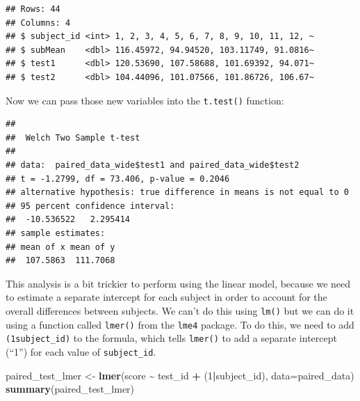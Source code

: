 \documentclass[
  12pt,
]{book}
\newenvironment{Shaded}{\begin{snugshade}}{\end{snugshade}}
\newcommand{\AttributeTok}[1]{\textcolor[rgb]{0.13,0.29,0.53}{#1}}
\newcommand{\DecValTok}[1]{\textcolor[rgb]{0.00,0.00,0.81}{#1}}
\newcommand{\FunctionTok}[1]{\textcolor[rgb]{0.13,0.29,0.53}{\textbf{#1}}}
\newcommand{\NormalTok}[1]{#1}
\newcommand{\OtherTok}[1]{\textcolor[rgb]{0.56,0.35,0.01}{#1}}
\newcommand{\SpecialCharTok}[1]{\textcolor[rgb]{0.81,0.36,0.00}{\textbf{#1}}}
\newcommand{\StringTok}[1]{\textcolor[rgb]{0.31,0.60,0.02}{#1}}
\begin{document}
\begin{verbatim}
## Rows: 44
## Columns: 4
## $ subject_id <int> 1, 2, 3, 4, 5, 6, 7, 8, 9, 10, 11, 12, ~
## $ subMean    <dbl> 116.45972, 94.94520, 103.11749, 91.0816~
## $ test1      <dbl> 120.53690, 107.58688, 101.69392, 94.071~
## $ test2      <dbl> 104.44096, 101.07566, 101.86726, 106.67~
\end{verbatim}

Now we can pass those new variables into the \texttt{t.test()} function:

\begin{Shaded}
\end{Shaded}

\begin{verbatim}
## 
##  Welch Two Sample t-test
## 
## data:  paired_data_wide$test1 and paired_data_wide$test2
## t = -1.2799, df = 73.406, p-value = 0.2046
## alternative hypothesis: true difference in means is not equal to 0
## 95 percent confidence interval:
##  -10.536522   2.295414
## sample estimates:
## mean of x mean of y 
##  107.5863  111.7068
\end{verbatim}

This analysis is a bit trickier to perform using the linear model, because we need to estimate a separate intercept for each subject in order to account for the overall differences between subjects. We can't do this using \texttt{lm()} but we can do it using a function called \texttt{lmer()} from the \texttt{lme4} package. To do this, we need to add \texttt{(1\textbar{}subject\_id)} to the formula, which tells \texttt{lmer()} to add a separate intercept (``1'') for each value of \texttt{subject\_id}.

\begin{Shaded}
\begin{Highlighting}[]
\NormalTok{paired\_test\_lmer }\OtherTok{\textless{}{-}} \FunctionTok{lmer}\NormalTok{(score }\SpecialCharTok{\textasciitilde{}}\NormalTok{ test\_id }\SpecialCharTok{+}\NormalTok{ (}\DecValTok{1}\SpecialCharTok{|}\NormalTok{subject\_id),}
                         \AttributeTok{data=}\NormalTok{paired\_data)}
\FunctionTok{summary}\NormalTok{(paired\_test\_lmer)}
\end{Highlighting}
\end{Shaded}
\end{document}
